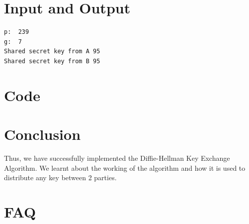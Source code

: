 \documentclass[11pt]{article}
\begin{document}
\section{Input and Output}

\begin{verbatim}
p:  239
g:  7
Shared secret key from A 95
Shared secret key from B 95
\end{verbatim}


\section{Code}


\section{Conclusion}
Thus, we have successfully implemented the Diffie-Hellman Key Exchange Algorithm. We learnt about the working of the algorithm and how it is used to distribute any key between 2 parties.
\clearpage

\section{FAQ}
\end{document}
